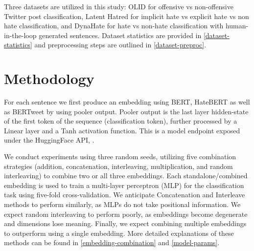 \documentclass{article} %
\begin{document}
Three datasets are utilized in this study: OLID \cite{zampieri2019predicting} for offensive vs non-offensive Twitter post classification, Latent Hatred \cite{elsherief-etal-2021-latent} for implicit hate vs explicit hate vs non hate classification, and DynaHate \cite{vidgen-etal-2021-learning} for hate vs non-hate classification with human-in-the-loop generated sentences. Dataset statistics are provided in \ref{dataset-statistics} and preprocessing steps are outlined in \ref{dataset-preproc}.

\section{Methodology}
\label{methodology}

For each sentence we first produce an embedding using BERT, HateBERT as well as BERTweet by using pooler output. Pooler output is the last layer hidden-state of the first token of the sequence (classification token), further processed by a Linear layer and a Tanh activation function. This is a model endpoint exposed under the HuggingFace API, \cite{wolf-etal-2020-transformers}.

We conduct experiments using three random seeds, utilizing five combination strategies (addition, concatenation, interleaving, multiplication, and random interleaving) to combine two or all three embeddings. Each standalone/combined embedding is used to train a multi-layer perceptron (MLP) for the classification task using five-fold cross-validation. We anticipate Concatenation and Interleave methods to perform similarly, as MLPs do not take positional information. We expect random interleaving to perform poorly, as embeddings become degenerate and dimensions lose meaning. Finally, we expect combining multiple embeddings to outperform using a single embedding. More detailed explanations of these methods can be found in \ref{embedding-combination} and \ref{model-params}.



\end{document}
